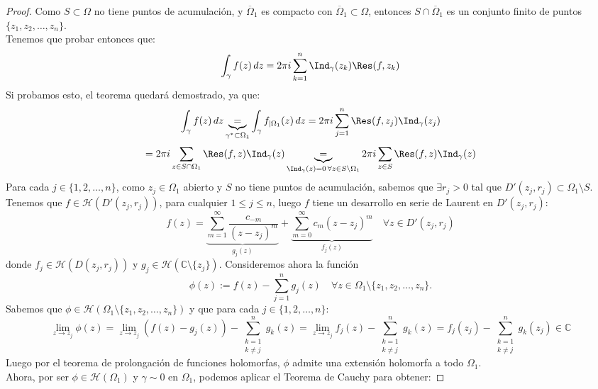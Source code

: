 \begin{proof}
    Como $S \subset \Omega$ no tiene puntos de acumulación, y $\overline{\Omega}_1$ es compacto con $\overline{\Omega}_1 \subset \Omega$, entonces $S \cap \overline{\Omega}_1$ es un conjunto finito de puntos $\{z_1, z_2, \ldots, z_n\}$.\\
    Tenemos que probar entonces que:
    \[
        \int_{\gamma} f(z) \, dz =
        2 \pi i \sum_{k=1}^{n} \Ind_\gamma (z_k) \Res(f,z_k)
    \]
    Si probamos esto, el teorema quedará demostrado, ya que:
    \[
        \int_{\gamma} f(z) \, dz \underbrace{=}_{\gamma^* \subset \Omega_1}
        \int_{\gamma} f_{|\Omega_1}(z) \, dz =
        2 \pi i \sum_{j=1}^{n} \Res(f, z_j) \Ind_\gamma (z_j) 
    \]
    \[
        = 2 \pi i \sum_{z \in S \cap \Omega_1} \Res(f, z) \Ind_\gamma (z) \underbrace{=}_{\Ind_\gamma (z) = 0 \, \forall z \in S \setminus \Omega_1}
        2 \pi i \sum_{z \in S} \Res(f, z) \Ind_\gamma (z)
    \]
    Para cada $j \in \{1, 2, \ldots, n\}$, como $z_j \in \Omega_1$ abierto y $S$ no tiene puntos de acumulación, sabemos que $\exists r_j > 0$ tal que $D'(z_j, r_j) \subset \Omega_1 \setminus S$.\\
    Tenemos que $f \in \mathcal{H}(D'(z_j, r_j))$, para cualquier $1 \leq j \leq n$, luego $f$ tiene un desarrollo en serie de Laurent en $D'(z_j, r_j)$:
    \[
        f(z) = \underbrace{\sum_{m=1}^{\infty} \frac{c_{-m}}{(z-z_j)^m}}_{g_j(z)} + \underbrace{\sum_{m=0}^{\infty} c_m (z-z_j)^m}_{f_j(z)} \quad \forall z \in D'(z_j, r_j)
    \]
    donde $f_j \in \mathcal{H}(D(z_j, r_j))$ y $g_j \in \mathcal{H}(\mathbb{C} \setminus \{z_j\})$. Consideremos ahora la función
    \[
    \phi(z) := f(z) - \sum_{j=1}^{n} g_j(z) \quad \forall z \in \Omega_1 \setminus \{ z_1, z_2, \ldots, z_n \}.
    \]
    Sabemos que $\phi \in \mathcal{H}(\Omega_1 \setminus \{ z_1, z_2, \ldots, z_n \})$ y que para cada $j \in \{1, 2, \ldots, n\}$:
    \[
    \lim_{z \to z_j} \phi(z) = 
    \lim_{z \to z_j} \left( f(z) - g_j(z) \right) - \sum_{\substack{k=1 \\ k \neq j}}^{n} g_k(z) =
    \lim_{z \to z_j} f_j(z) - \sum_{\substack{k=1 \\ k \neq j}}^{n} g_k(z) = f_j(z_j) - \sum_{\substack{k=1 \\ k \neq j}}^{n} g_k(z_j) \in \mathbb{C}
    \]
    Luego por el teorema de prolongación de funciones holomorfas, $\phi$ admite una extensión holomorfa a todo $\Omega_1$.\\
    Ahora, por ser $\phi \in \mathcal{H}(\Omega_1)$ y $\gamma \sim 0$ en $\Omega_1$, podemos aplicar el Teorema de Cauchy para obtener:

\end{proof}
